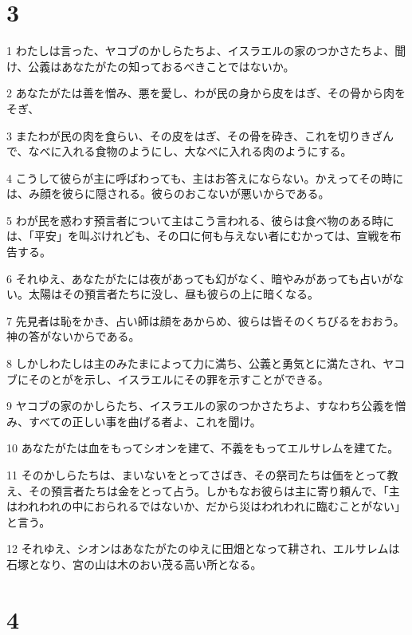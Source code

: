\chapter{3}

\par 1 わたしは言った、ヤコブのかしらたちよ、イスラエルの家のつかさたちよ、聞け、公義はあなたがたの知っておるべきことではないか。
\par 2 あなたがたは善を憎み、悪を愛し、わが民の身から皮をはぎ、その骨から肉をそぎ、
\par 3 またわが民の肉を食らい、その皮をはぎ、その骨を砕き、これを切りきざんで、なべに入れる食物のようにし、大なべに入れる肉のようにする。
\par 4 こうして彼らが主に呼ばわっても、主はお答えにならない。かえってその時には、み顔を彼らに隠される。彼らのおこないが悪いからである。
\par 5 わが民を惑わす預言者について主はこう言われる、彼らは食べ物のある時には、「平安」を叫ぶけれども、その口に何も与えない者にむかっては、宣戦を布告する。
\par 6 それゆえ、あなたがたには夜があっても幻がなく、暗やみがあっても占いがない。太陽はその預言者たちに没し、昼も彼らの上に暗くなる。
\par 7 先見者は恥をかき、占い師は顔をあからめ、彼らは皆そのくちびるをおおう。神の答がないからである。
\par 8 しかしわたしは主のみたまによって力に満ち、公義と勇気とに満たされ、ヤコブにそのとがを示し、イスラエルにその罪を示すことができる。
\par 9 ヤコブの家のかしらたち、イスラエルの家のつかさたちよ、すなわち公義を憎み、すべての正しい事を曲げる者よ、これを聞け。
\par 10 あなたがたは血をもってシオンを建て、不義をもってエルサレムを建てた。
\par 11 そのかしらたちは、まいないをとってさばき、その祭司たちは価をとって教え、その預言者たちは金をとって占う。しかもなお彼らは主に寄り頼んで、「主はわれわれの中におられるではないか、だから災はわれわれに臨むことがない」と言う。
\par 12 それゆえ、シオンはあなたがたのゆえに田畑となって耕され、エルサレムは石塚となり、宮の山は木のおい茂る高い所となる。

\chapter{4}

